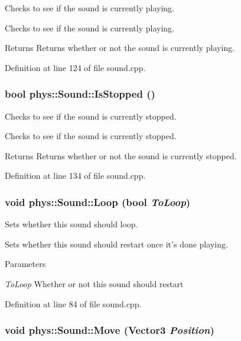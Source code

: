 Checks to see if the sound is currently playing. 

Checks to see if the sound is currently playing. \begin{DoxyReturn}{Returns}
Returns whether or not the sound is currently playing. 
\end{DoxyReturn}


Definition at line 124 of file sound.cpp.

\hypertarget{classphys_1_1Sound_ac35ba604ca2aaab246e5ce5f524d10f9}{
\subsubsection[{IsStopped}]{\setlength{\rightskip}{0pt plus 5cm}bool phys::Sound::IsStopped ()}}
\label{dc/d2f/classphys_1_1Sound_ac35ba604ca2aaab246e5ce5f524d10f9}


Checks to see if the sound is currently stopped. 

Checks to see if the sound is currently stopped. \begin{DoxyReturn}{Returns}
Returns whether or not the sound is currently stopped. 
\end{DoxyReturn}


Definition at line 134 of file sound.cpp.

\hypertarget{classphys_1_1Sound_afd5645195ac744de62c5eefc01dbf0d0}{
\subsubsection[{Loop}]{\setlength{\rightskip}{0pt plus 5cm}void phys::Sound::Loop (bool {\em ToLoop})}}
\label{dc/d2f/classphys_1_1Sound_afd5645195ac744de62c5eefc01dbf0d0}


Sets whether this sound should loop. 

Sets whether this sound should restart once it's done playing. 
\begin{DoxyParams}{Parameters}
\item[{\em ToLoop}]Whether or not this sound should restart \end{DoxyParams}


Definition at line 84 of file sound.cpp.

\hypertarget{classphys_1_1Sound_a62075a732f25c0a07b428c09c6232814}{
\subsubsection[{Move}]{\setlength{\rightskip}{0pt plus 5cm}void phys::Sound::Move ({\bf Vector3} {\em Position})}}
\label{dc/d2f/classphys_1_1Sound_a62075a732f25c0a07b428c09c6232814}


